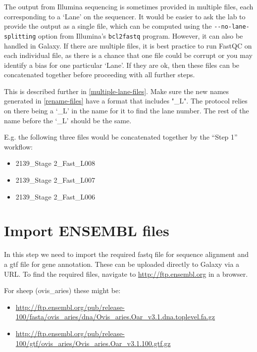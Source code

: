 \documentclass[
]{book}
\providecommand{\tightlist}{%
  \setlength{\itemsep}{0pt}\setlength{\parskip}{0pt}}
\begin{document}
The output from Illumina sequencing is sometimes provided in multiple files, each corresponding to a `Lane' on the sequencer. It would be easier to ask the lab to provide the output as a single file, which can be computed using the \texttt{-\/-no-lane-splitting} option from Illumina's \texttt{bcl2fastq} program. However, it can also be handled in Galaxy. If there are multiple files, it is best practice to run FastQC on each individual file, as there is a chance that one file could be corrupt or you may identify a bias for one particular `Lane'. If they are ok, then these files can be concatenated together before proceeding with all further steps.

This is described further in \ref{multiple-lane-files}. Make sure the new names generated in \ref{rename-files} have a format that includes "\_L". The protocol relies on there being a `\_L' in the name for it to find the lane number. The rest of the name before the `\_L' should be the same.

E.g. the following three files would be concatenated together by the ``Step 1'' workflow:

\begin{itemize}
\tightlist
\item
  2139\_Stage 2\_Fast\_L008
\item
  2139\_Stage 2\_Fast\_L007
\item
  2139\_Stage 2\_Fast\_L006
\end{itemize}

\hypertarget{import-ensembl-files}{%
\section{Import ENSEMBL files}\label{import-ensembl-files}}

In this step we need to import the required fastq file for sequence alignment and a gtf file for gene annotation.
These can be uploaded directly to Galaxy via a URL. To find the required files, navigate to \url{http://ftp.ensembl.org} in a browser.

For sheep (ovis\_aries) these might be:

\begin{itemize}
\tightlist
\item
  \url{http://ftp.ensembl.org/pub/release-100/fasta/ovis_aries/dna/Ovis_aries.Oar_v3.1.dna.toplevel.fa.gz}
\item
  \url{http://ftp.ensembl.org/pub/release-100/gtf/ovis_aries/Ovis_aries.Oar_v3.1.100.gtf.gz}
\end{itemize}
\end{document}
